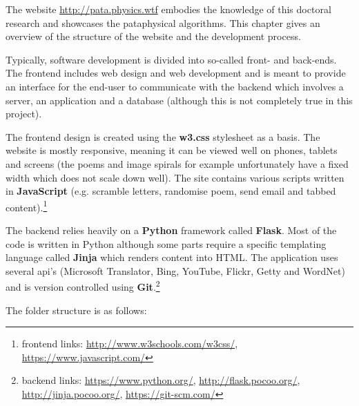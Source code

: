 The website \url{http://pata.physics.wtf} embodies the knowledge of this doctoral research and showcases the pataphysical algorithms. This chapter gives an overview of the structure of the website and the development process.

Typically, software development is divided into so-called front- and back-ends. The frontend includes web design and web development and is meant to provide an interface for the end-user to communicate with the backend which involves a server, an application and a database (although this is not completely true in this project).

The frontend design is created using the \textbf{w3.css} stylesheet as a basis. The website is mostly responsive, meaning it can be viewed well on phones, tablets and screens (the poems and image spirals for example unfortunately have a fixed width which does not scale down well). The site contains various scripts written in \textbf{JavaScript} (e.g. scramble letters, randomise poem, send email and tabbed content).\footnote{frontend links: \url{http://www.w3schools.com/w3css/}, \url{https://www.javascript.com/}}

The backend relies heavily on a \textbf{Python} framework called \textbf{Flask}. Most of the code is written in Python although some parts require a specific templating language called \textbf{Jinja} which renders content into HTML. The application uses several \acs{api}'s (Microsoft Translator, Bing, YouTube, Flickr, Getty and WordNet) and is version controlled using \textbf{Git}.\footnote{backend links: \url{https://www.python.org/}, \url{http://flask.pocoo.org/}, \url{http://jinja.pocoo.org/}, \url{https://git-scm.com/}}

The folder structure is as follows:

